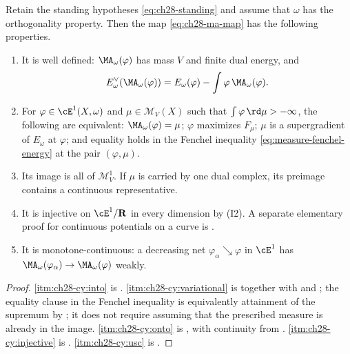 \begin{theorem}
\label{thm:ch28-calabi-yau}
Retain the standing hypotheses \eqref{eq:ch28-standing} and assume that
$\omega$ has the orthogonality property.  Then the map
\eqref{eq:ch28-ma-map} has the following properties.
\begin{enumerate}
\item\label{itm:ch28-cy:into}
 It is well defined: $\MA_\omega(\varphi)$ has mass $V$ and finite dual
 energy, and
 \[
  E^\vee_\omega(\MA_\omega(\varphi))
  =E_\omega(\varphi)-\int\varphi\,\MA_\omega(\varphi).
 \]
\item\label{itm:ch28-cy:variational}
 For $\varphi\in\cE^1(X,\omega)$ and $\mu\in\mathcal M_V(X)$ such
 that $\int\varphi\,\rd\mu> -\infty$, the following are equivalent:
 $\MA_\omega(\varphi)=\mu$; $\varphi$
 maximizes $F_\mu$; $\mu$ is a supergradient of $E_\omega$ at
 $\varphi$; and equality holds in the Fenchel inequality
 \eqref{eq:measure-fenchel-energy} at the pair $(\varphi,\mu)$.
\item\label{itm:ch28-cy:onto}
 Its image is all of $\mathcal M^1_V$.  If $\mu$ is carried by one
 dual complex, its preimage contains a continuous representative.
\item\label{itm:ch28-cy:injective}
 It is injective on $\cE^1/\mathbf R$ in every dimension by
 \textup{(I2)}.  A separate elementary proof for continuous potentials
 on a curve is .
\item\label{itm:ch28-cy:usc}
 It is monotone-continuous: a decreasing net
 $\varphi_\alpha\searrow\varphi$ in $\cE^1$ has
 $\MA_\omega(\varphi_\alpha)\to\MA_\omega(\varphi)$ weakly.
\end{enumerate}
\end{theorem}

\begin{proof}
\cref{itm:ch28-cy:into} is .
\cref{itm:ch28-cy:variational} is
 together with
 and
; the equality clause in the
Fenchel inequality is equivalently attainment of the supremum
by ; it does not require assuming
that the prescribed measure is already in the image.
\cref{itm:ch28-cy:onto} is
, with continuity from
.  \cref{itm:ch28-cy:injective} is
\cite[Proposition~8.2]{BFJ15}.  \cref{itm:ch28-cy:usc} is
.
\end{proof}

